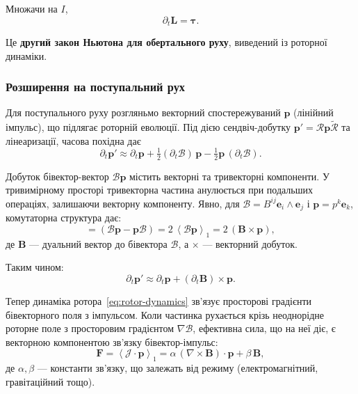 \documentclass[11pt,a4paper]{article}
\newcommand{\e}{\mathbf{e}}
\newcommand{\grade}[2]{\left\langle #1 \right\rangle_{#2}}
\newcommand{\vecp}[1]{\grade{#1}{1}}
\newcommand{\rev}[1]{\widetilde{#1}}           %
\newcommand{\Rotor}{\mathcal{R}}
\newcommand{\Biv}{\mathcal{B}}
\theoremstyle{definition}
\theoremstyle{plain}
\theoremstyle{remark}
\begin{document}
Множачи на $I$,
\begin{equation}
\partial_t \bm{L} = \bm{\tau}.
\label{eq:newton-rotational}
\end{equation}

Це \textbf{другий закон Ньютона для обертального руху}, виведений із роторної динаміки.

\subsubsection{Розширення на поступальний рух}

Для поступального руху розгляньмо векторний спостережуваний $\mathbf{p}$ (лінійний імпульс), що підлягає роторній еволюції. Під дією сендвіч-добутку $\mathbf{p}' = \Rotor \mathbf{p} \rev{\Rotor}$ та лінеаризації, часова похідна дає
\begin{equation}
\partial_t \mathbf{p}' \approx \partial_t \mathbf{p} + \tfrac{1}{2}(\partial_t\Biv)\, \mathbf{p} - \tfrac{1}{2}\mathbf{p}\,(\partial_t\Biv).
\end{equation}

Добуток бівектор-вектор $\Biv \mathbf{p}$ містить векторні та тривекторні компоненти. У тривимірному просторі тривекторна частина анулюється при подальших операціях, залишаючи векторну компоненту. Явно, для $\Biv = B^{ij}\e_i\wedge\e_j$ і $\mathbf{p} = p^k\e_k$, комутаторна структура дає:
\begin{equation}
[\Biv, \mathbf{p}] = (\Biv\mathbf{p} - \mathbf{p}\Biv) = 2\,\vecp{\Biv \mathbf{p}} = 2\,(\mathbf{B} \times \mathbf{p}),
\end{equation}
де $\mathbf{B}$ — дуальний вектор до бівектора $\Biv$, а $\times$ — векторний добуток.

Таким чином:
\begin{equation}
\partial_t \mathbf{p}' \approx \partial_t \mathbf{p} + (\partial_t\mathbf{B}) \times \mathbf{p}.
\end{equation}

Тепер динаміка ротора~\eqref{eq:rotor-dynamics} зв'язує просторові градієнти бівекторного поля з імпульсом. Коли частинка рухається крізь неоднорідне роторне поле з просторовим градієнтом $\nabla\Biv$, ефективна сила, що на неї діє, є векторною компонентою зв'язку бівектор-імпульс:
\begin{equation}
\mathbf{F} = \vecp{\mathcal{J} \cdot \mathbf{p}} = \alpha\,(\nabla \times \mathbf{B}) \cdot \mathbf{p} + \beta\,\mathbf{B},
\end{equation}
де $\alpha, \beta$ — константи зв'язку, що залежать від режиму (електромагнітний, гравітаційний тощо).
\end{document}
